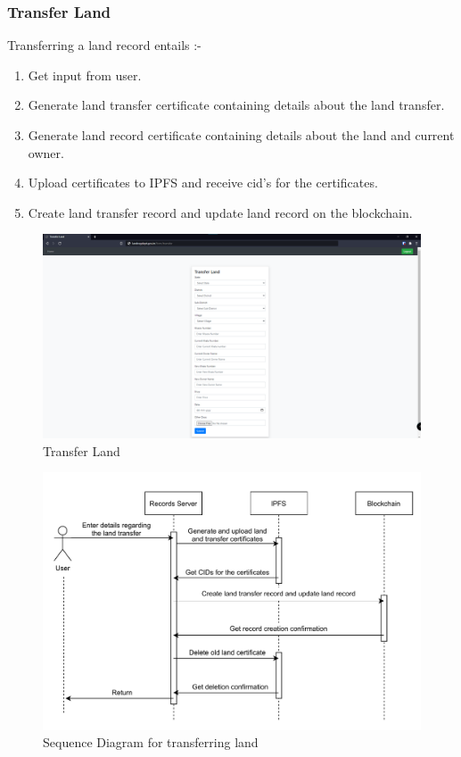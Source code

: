 \documentclass{article}
\begin{document}
        \subsubsection{Transfer Land}
            Transferring a land record entails :-
            \begin{enumerate}
                \item Get input from user.
                \item Generate land transfer certificate containing details about the land transfer.
                \item Generate land record certificate containing details about the land and current owner.
                \item Upload certificates to IPFS and receive \gls{cid}'s for the certificates.
                \item Create land transfer record and update land record on the blockchain.
            \end{enumerate}
            \begin{figure}[htbp]
                \includegraphics[scale=0.25]{records_transfer}
                \centering
                \caption{Transfer Land}
            \end{figure}

            \begin{figure}[htbp]
                \includegraphics[scale=0.25]{records_seq_transfer}
                \centering
                \caption{Sequence Diagram for transferring land}
            \end{figure}
\end{document}
